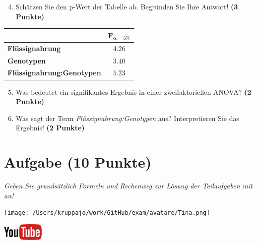 \documentclass[a4paper, 9pt]{scrartcl}\usepackage[]{graphicx}\usepackage[]{xcolor}
\begin{document}
\begin{enumerate}
  \setcounter{enumi}{3}
\item Schätzen Sie den p-Wert der Tabelle ab. Begründen Sie Ihre
  Antwort! \textbf{(3 Punkte)}
\end{enumerate}
  
\begin{center}
    \Large
\begin{tabular}{lc}
  \toprule
     & $\boldsymbol{F_{\alpha = 5\%}}$ \\
\midrule
  \textbf{Flüssignahrung} & $4.26$ \\
  \textbf{Genotypen} & $3.40$ \\
  \textbf{Flüssignahrung:Genotypen} & $5.23$ \\
  \bottomrule
  \end{tabular}
\end{center}

\begin{enumerate}
  \setcounter{enumi}{4}
\item Was bedeutet ein signifikantes Ergebnis in einer zweifaktoriellen ANOVA? \textbf{(2 Punkte)}
\item Was sagt der Term \textit{Flüssignahrung:Genotypen} aus? Interpretieren Sie das Ergebnis! \textbf{(2 Punkte)}
\end{enumerate}
 
\clearpage

\section{Aufgabe \hfill (10 Punkte)}

\textit{Geben Sie grundsätzlich Formeln und Rechenweg zur Lösung der Teilaufgaben mit an!} \\[1Ex]
 

 
\begin{minipage}[t]{0.5\textwidth}
\texttt{[image: /Users/kruppajo/work/GitHub/exam/avatare/Tina.png]}
\end{minipage}
\begin{minipage}[t]{0.5\textwidth}
\hfill
\href{https://youtu.be/rWTyHXXlYjY}{\includegraphics[width = 2cm]{img/youtube}}\\[1Ex]
\end{minipage}
\vspace{1ex}
\end{document}
